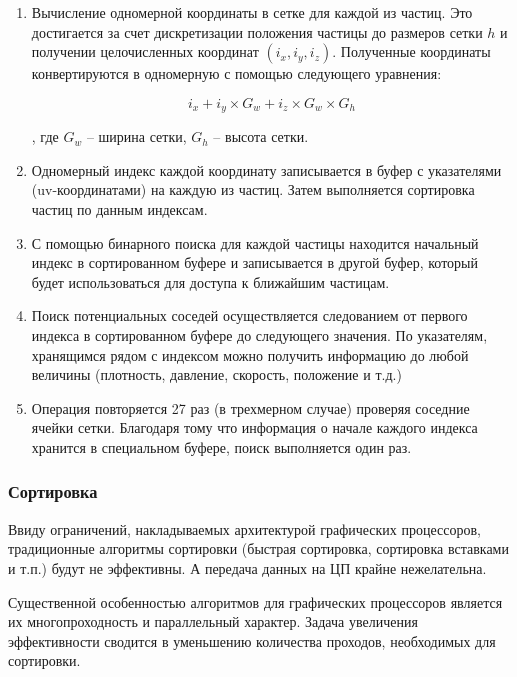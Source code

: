 \begin{enumerate}
  \item Вычисление одномерной координаты в сетке для каждой из частиц. Это достигается за счет
    дискретизации положения частицы до размеров сетки $h$ и получении целочисленных координат
    $(i_x, i_y, i_z)$. Полученные координаты конвертируются в одномерную с помощью следующего
    уравнения:

    \begin{equation}
    \label{eq:}
      i_x + i_y \times G_w + i_z \times G_w \times G_h
    \end{equation}

    , где $G_w$ -- ширина сетки, $G_h$ -- высота сетки.

  \item Одномерный индекс каждой координату записывается в буфер с указателями (uv-координатами)
    на каждую из частиц. Затем выполняется сортировка частиц по данным индексам.

  \item С помощью бинарного поиска для каждой частицы находится начальный индекс в сортированном
    буфере и записывается в другой буфер, который будет использоваться для доступа к ближайшим
    частицам.

  \item Поиск потенциальных соседей осуществляется следованием от первого индекса в сортированном
    буфере до следующего значения. По указателям, хранящимся рядом с индексом можно получить 
    информацию до любой величины (плотность, давление, скорость, положение и т.д.)

  \item Операция повторяется 27 раз (в трехмерном случае) проверяя соседние ячейки сетки.
    Благодаря тому что информация о начале каждого индекса хранится в специальном буфере,
    поиск выполняется один раз.

\end{enumerate}

\subsubsection{Сортировка}

Ввиду ограничений, накладываемых архитектурой графических процессоров, традиционные алгоритмы
сортировки (быстрая сортировка, сортировка вставками и т.п.) будут не эффективны. А передача
данных на ЦП крайне нежелательна.

Существенной особенностью алгоритмов для графических процессоров является их многопроходность
и параллельный характер. Задача увеличения эффективности сводится в уменьшению количества
проходов, необходимых для сортировки.

